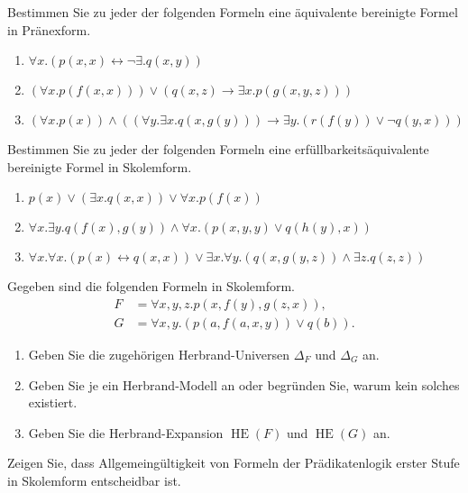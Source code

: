 \documentclass[german]{latteachCD}[2017/03/28]
\begin{document}
\begin{exercise}
  Bestimmen Sie zu jeder der folgenden Formeln eine äquivalente bereinigte
  Formel in Pränexform.
  \begin{enumerate}
  \item $\forall x.(p(x,x) \leftrightarrow \lnot \exists.q(x,y))$
  \item $(\forall x.p(f(x,x))) \lor (q(x,z) \to \exists x.p(g(x,y,z)))$
  \item $(\forall x.p(x)) \land ((\forall y.\exists x.q(x,g(y))) \to \exists
    y.(r(f(y)) \lor \lnot q(y,x)))$
  \end{enumerate}
\end{exercise}

\newpage

\begin{exercise}
  Bestimmen Sie zu jeder der folgenden Formeln eine erfüllbarkeitsäquivalente
  bereinigte Formel in Skolemform.
  \begin{enumerate}
  \item $p(x) \lor (\exists x.q(x,x)) \lor \forall x.p(f(x))$
  \item $\forall x.\exists y.q(f(x),g(y)) \land \forall x.(p(x,y,y) \lor
    q(h(y),x))$
  \item $\forall x.\forall x.(p(x) \leftrightarrow q(x,x)) \lor \exists
    x.\forall y.(q(x,g(y,z)) \land \exists z.q(z,z))$
  \end{enumerate}
\end{exercise}


\begin{exercise}
  Gegeben sind die folgenden Formeln in Skolemform.
  \begin{align*}
    F &= \forall x, y, z. p(x,f(y),g(z,x)),\\
    G &= \forall x,y. (p(a,f(a,x,y)) \lor q(b)).
  \end{align*}
  \begin{enumerate}
  \item Geben Sie die zugehörigen Herbrand-Universen $\Delta_{F}$ und
    $\Delta_{G}$ an.
  \item Geben Sie je ein Herbrand-Modell an oder begründen Sie, warum kein
    solches existiert.
  \item Geben Sie die Herbrand-Expansion $\operatorname{HE}(F)$ und
    $\operatorname{HE}(G)$ an.
  \end{enumerate}
\end{exercise}

\begin{exercise}
  Zeigen Sie, dass Allgemeingültigkeit von Formeln der Prädikatenlogik erster
  Stufe in Skolemform entscheidbar ist.
\end{exercise}
\end{document}

